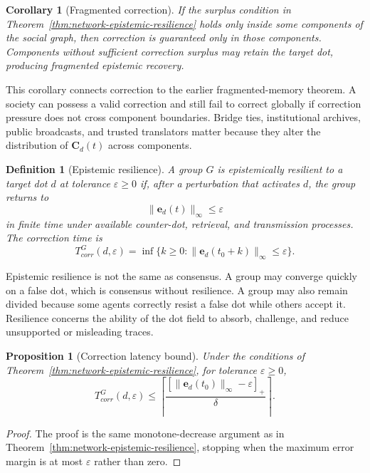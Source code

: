 \documentclass[11pt]{article}
\newtheorem{definition}{Definition}
\newtheorem{proposition}{Proposition}
\newtheorem{corollary}{Corollary}
\theoremstyle{remark}
\begin{document}
\begin{corollary}[Fragmented correction]\label{cor:fragmented-correction}
If the surplus condition in
Theorem~\ref{thm:network-epistemic-resilience} holds only inside some
components of the social graph, then correction is guaranteed only in
those components. Components without sufficient correction surplus may
retain the target dot, producing fragmented epistemic recovery.
\end{corollary}


This corollary connects correction to the earlier fragmented-memory
theorem. A society can possess a valid correction and still fail to
correct globally if correction pressure does not cross component
boundaries. Bridge ties, institutional archives, public broadcasts, and
trusted translators matter because they alter the distribution of
$\mathbf C_d(t)$ across components.

\begin{definition}[Epistemic resilience]\label{def:epistemic-resilience}
A group $G$ is epistemically resilient to a target dot $d$ at tolerance
$\varepsilon\geq0$ if, after a perturbation that activates $d$, the group
returns to
$$
\|\mathbf e_d(t)\|_\infty\leq\varepsilon
$$
in finite time under available counter-dot, retrieval, and transmission
processes. The correction time is
$$
T_{corr}^{G}(d,\varepsilon)=
\inf\{k\geq0:\|\mathbf e_d(t_0+k)\|_\infty\leq\varepsilon\}.
$$
\end{definition}

Epistemic resilience is not the same as consensus. A group may converge
quickly on a false dot, which is consensus without resilience. A group
may also remain divided because some agents correctly resist a false dot
while others accept it. Resilience concerns the ability of the dot field
to absorb, challenge, and reduce unsupported or misleading traces.

\begin{proposition}[Correction latency bound]\label{prop:correction-latency-bound}
Under the conditions of Theorem~\ref{thm:network-epistemic-resilience},
for tolerance $\varepsilon\geq0$,
$$
T_{corr}^{G}(d,\varepsilon)\leq
\left\lceil
\frac{[\|\mathbf e_d(t_0)\|_\infty-\varepsilon]_+}{\delta}
\right\rceil.
$$
\end{proposition}

\begin{proof}
The proof is the same monotone-decrease argument as in
Theorem~\ref{thm:network-epistemic-resilience}, stopping when the maximum
error margin is at most $\varepsilon$ rather than zero.
\end{proof}
\end{document}
